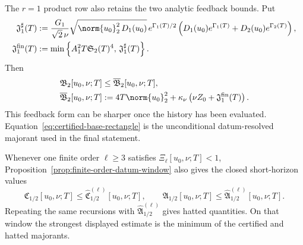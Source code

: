 The \(r=1\) product row also retains the two analytic feedback bounds.  Put
\begin{align}
 \mathfrak J_1^\sharp(T)
 &:=
 \frac{G_1}{\sqrt2\,\nu}
 \sqrt{\norm{u_0}_2^2\,D_1(u_0)}\,e^{\Gamma_1(T)/2}
 \left(
  D_1(u_0)e^{\Gamma_1(T)}
  +D_2(u_0)e^{\Gamma_2(T)}
 \right),
 \notag\\
 \mathfrak J_1^{\mathrm{fin}}(T)
 &:=
 \min\left\{
  A_1^2T\mathfrak S_2(T)^4,\,
  \mathfrak J_1^\sharp(T)
 \right\}.
 \label{eq:global-graph-action-best}
\end{align}
Then
\begin{equation}
 \begin{aligned}
 \mathfrak B_2[u_0,\nu;T]
 &\le\overline{\mathfrak B}_2[u_0,\nu;T],\\
 \overline{\mathfrak B}_2[u_0,\nu;T]
 &:=4T\norm{u_0}_2^2
 +\kappa_\nu\left(
  \nu Z_0+\mathfrak J_1^{\mathrm{fin}}(T)
 \right).
 \end{aligned}
 \label{eq:global-closed-base-rectangle}
\end{equation}
This feedback form can be sharper once the history has been evaluated.
Equation~\eqref{eq:certified-base-rectangle} is the unconditional
datum-resolved majorant used in the final statement.

Whenever one finite order \(\ell\ge3\) satisfies
\(\Xi_\ell[u_0,\nu;T]<1\),
Proposition~\ref{prop:finite-order-datum-window} also gives the closed
short-horizon values
\begin{equation}
 \mathfrak C_{1/2}[u_0,\nu;T]
 \le\widehat{\mathfrak C}_{1/2}^{(\ell)}[u_0,\nu;T],
 \qquad
 \mathfrak A_{1/2}[u_0,\nu;T]
 \le\widehat{\mathfrak A}_{1/2}^{(\ell)}[u_0,\nu;T].
 \label{eq:global-finite-order-data-majorants}
\end{equation}
Repeating the same recursions with
\(\widehat{\mathfrak A}_{1/2}^{(\ell)}\) gives hatted quantities.  On that
window the strongest displayed estimate is the minimum of the certified and
hatted majorants.

